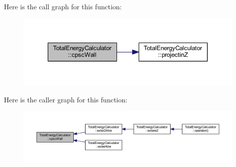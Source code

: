 Here is the call graph for this function\+:\nopagebreak
\begin{figure}[H]
\begin{center}
\leavevmode
\includegraphics[width=340pt]{class_total_energy_calculator_a5a8e2104a52069da69d55e8e73b912e1_cgraph}
\end{center}
\end{figure}




Here is the caller graph for this function\+:
\nopagebreak
\begin{figure}[H]
\begin{center}
\leavevmode
\includegraphics[width=350pt]{class_total_energy_calculator_a5a8e2104a52069da69d55e8e73b912e1_icgraph}
\end{center}
\end{figure}



